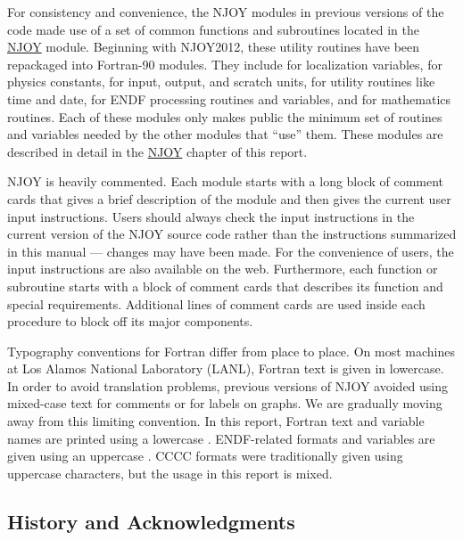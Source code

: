 For consistency and convenience, the NJOY modules in previous
versions of the code made use of a set of common functions and
subroutines located in the \hyperlink{sNJOYhy}{NJOY} module.  Beginning
with NJOY2012, these utility routines have been repackaged into
Fortran-90 modules.  They include  for
localization variables,
 for physics constants,  for
input, output, and scratch units,  for utility
routines like time and date,  for ENDF processing
routines and variables, and  for mathematics
routines.  Each of these modules only makes public the
minimum set of routines and variables needed by the other
modules that ``use'' them.  These modules are described in detail
in the \hyperlink{sNJOYhy}{NJOY} chapter of this report.

NJOY is heavily commented.  Each module starts
with a long block of comment cards that gives a brief description
of the module and then gives the current user input instructions.
 Users should always check the input
instructions in the current version of the NJOY source code rather
than the instructions summarized in this manual --- changes may have
been made.  For the convenience of users, the input instructions
are also available on the web\cite{webinclude}.  Furthermore, each function
or subroutine starts with a block of comment cards that describes
its function and special requirements.  Additional lines of
comment cards are used inside each procedure to block off its
major components.

Typography conventions for Fortran differ from place to place.
On most machines at Los Alamos National Laboratory (LANL), Fortran
text is given in lowercase.  In
order to avoid translation problems, previous
versions of NJOY avoided using mixed-case text
for comments or for labels on graphs.  We are gradually moving away
from this limiting convention.  In this report, Fortran text and
variable names are printed using a lowercase .
  ENDF-related formats and variables
are given using an uppercase .   CCCC formats were
traditionally given using uppercase characters,
but the usage in this report is mixed.

\subsection{History and Acknowledgments}
\label{ssINTRO_history}

